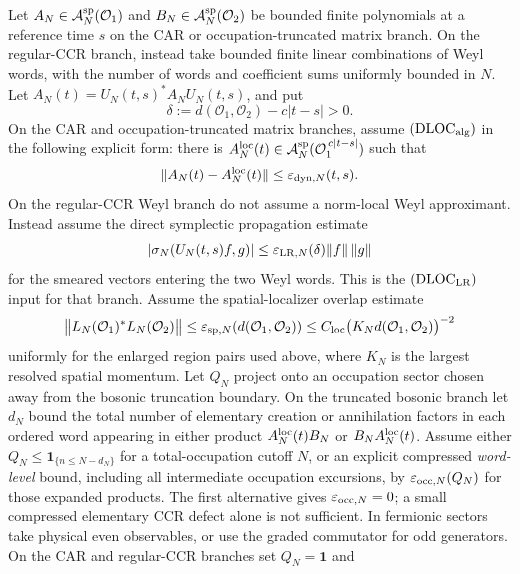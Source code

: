 \documentclass[12pt,a4paper]{article}
\begin{document}
\begin{theorem}
\label{p4:thm:approximate-microcausality}
Let \(A_N\in\mathcal A_N^{\rm sp}(\mathcal O_1)\) and
\(B_N\in\mathcal A_N^{\rm sp}(\mathcal O_2)\) be bounded finite
polynomials at a reference time \(s\) on the CAR or
occupation-truncated matrix branch.  On the regular-CCR branch, instead
take bounded finite linear combinations of Weyl words, with the number of
words and coefficient sums uniformly bounded in \(N\).  Let
\(A_N(t)=U_N(t,s)^*A_NU_N(t,s)\), and put
\[
\delta:=d(\mathcal O_1,\mathcal O_2)-c|t-s|>0.
\]
On the CAR and occupation-truncated matrix branches, assume
\((\mathrm{DLOC}_{\rm alg})\) in the following explicit form: there is
\(A_N^{\rm loc}(t)\in
\mathcal A_N^{\rm sp}(\mathcal O_1^{\,c|t-s|})\) such that
\[
\|A_N(t)-A_N^{\rm loc}(t)\|
\le\varepsilon_{{\rm dyn},N}(t,s).
\]
On the regular-CCR Weyl branch do not assume a norm-local Weyl approximant.
Instead assume the direct symplectic propagation estimate
\[
 |\sigma_N(U_N(t,s)f,g)|
 \le\varepsilon_{{\rm LR},N}(\delta)\|f\|\,\|g\|
\]
for the smeared vectors entering the two Weyl words.  This is the
\((\mathrm{DLOC}_{\rm LR})\) input for that branch.
Assume the spatial-localizer overlap estimate
\begin{equation}
\label{p4:eq:spectral-leakage-bound}
\bigl\|L_N(\mathcal O_1)^*L_N(\mathcal O_2)\bigr\|
\le
\varepsilon_{{\rm sp},N}\!\left(d(\mathcal O_1,\mathcal O_2)\right)
\le
C_{\rm loc}\bigl(K_Nd(\mathcal O_1,\mathcal O_2)\bigr)^{-2}
\end{equation}
uniformly for the enlarged region pairs used above, where \(K_N\) is the
largest resolved spatial momentum.  Let \(Q_N\) project onto an occupation
sector chosen away from the bosonic truncation boundary. On the truncated
bosonic branch let \(d_N\) bound the total number of elementary creation or
annihilation factors in each ordered word appearing in either product
\(A_N^{\rm loc}(t)B_N\) or \(B_NA_N^{\rm loc}(t)\). Assume either
\(Q_N\le\mathbf1_{\{n\le N-d_N\}}\) for a total-occupation
cutoff \(N\), or an explicit compressed \emph{word-level} bound, including
all intermediate occupation excursions, by
\(\varepsilon_{{\rm occ},N}(Q_N)\) for those expanded products.
The first alternative gives \(\varepsilon_{{\rm occ},N}=0\);
a small compressed elementary CCR defect alone is not sufficient.  In fermionic sectors take physical even
observables, or use the graded commutator for odd generators.  On the CAR
and regular-CCR branches set \(Q_N=\mathbf1\) and

\end{theorem}
\end{document}
